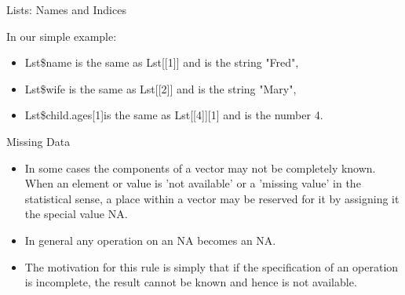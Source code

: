 \documentclass[pdf,default,slideColor,colorBG]{prosper}
\begin{document}
\begin{slide}{Lists: Names and Indices}

In our simple example:
\begin{itemize}
\item Lst\$name  is the same as  Lst[[1]] and is the string
"Fred",

\item Lst\$wife  is the same as  Lst[[2]]
 and is the string "Mary",

\item Lst\$child.ages[1]is the same as Lst[[4]][1] and is the
number 4.
\end{itemize}
\end{slide}
\begin{slide}{Missing Data}
\begin{itemize}
\item In some cases the components of a vector may not be
completely known. When an element or value is 'not available' or a
'missing value' in the statistical sense, a place within a vector
may be reserved for it by assigning it the special value NA.

\item In general any operation on an NA becomes an NA.
\item The motivation for this rule is simply that if the specification of an operation
is incomplete, the result cannot be known and hence is not available.
\end{itemize}
\end{slide}
\end{document}
